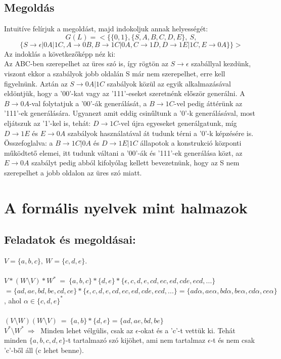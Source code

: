 \documentclass[12pt]{article}
\begin{document}
\subsection{Megoldás}
Intuitíve felírjuk a megoldást, majd indokoljuk annak helyességét:
$$ G(L)=<\{ \{ 0,1 \}, \{ S,A,B,C,D,E \}, \ S, $$ $$ \{ S \rightarrow \epsilon|0A|1C, A \rightarrow 
0B, B \rightarrow 1C|0A, C \rightarrow 1D, D \rightarrow 1E|1C, E \rightarrow 0A \}\}> $$
Az indoklás a következőképp néz ki: \\ Az ABC-ben szerepelhet az üres szó is, 
így rögtön az $S \rightarrow \epsilon$ szabállyal kezdünk, viszont ekkor a szabályok jobb oldalán S már nem
szerepelhet, erre kell figyelnünk. Aztán az $ S \rightarrow 0A|1C$ szabályok közül az egyik alkalmazásával
eldöntjük, hogy a '00'-kat vagy az '111'-eseket szeretnénk először generálni. A $B \rightarrow 0A$-val folytatjuk a
'00'-ák generálását, a $B \rightarrow 1C$-vel pedig áttérünk az '111'-ek generálására. Ugyanezt amit eddig 
csinűltunk a '0'-k generálásával, most eljátszuk az '1'-kel is, tehát: $D \rightarrow 1C$-vel újra egyeseket 
generálgatunk, míg $D \rightarrow 1E$ és $E \rightarrow 0A$ szabályok használatával át tudunk térni a '0'-k 
képzésére is. Összefoglalva: a $B \rightarrow 1C|0A$ és $D \rightarrow 1E|1C$ állapotok a konstrukció központi 
működtető elemei, itt tudunk váltani a '00'-ák és '111'-ek generálása közt, az $E \rightarrow 0A$ szabályt 
pedig abból kifolyólag kellett bevezetnünk, hogy az S nem szerepelhet a jobb oldalon az üres szó miatt.

\section{A formális nyelvek mint halmazok}
\subsection{Feladatok és megoldásai: \\}
$ V=\{ a,b,c \}, \ W=\{ c,d,e \} .$ \\\\
$ V*(W \setminus V)*W^* \ =\ \{a,b,c\}*\{d,e\}*\{\epsilon, c, d, e, cd, ec, ed, cde, ecd, ...\} $ \\
$= \{ad, ae, bd, be, cd, ce\}*\{\epsilon, c, d, e, cd, ec, ed, cde, ecd, ...\} = \{ ad\alpha,
ae\alpha, bd\alpha, be\alpha, cd\alpha, ce\alpha \} $, ahol $\alpha \in \{c,d,e \}^{*}$ \\\\
$ (V \setminus W)(W \setminus V) \ =\ \{a,b\}*\{d,e\} = \{ ad, ae, bd, be \} $ \\
$ V^* \setminus W^*\ \Longrightarrow \ $ Minden lehet vélgülis, csak az $\epsilon$-okat
és a 'c'-t vettük ki. Tehát minden $\{ a,b,c,d,e \} $-t tartalmazó szó kijöhet, ami nem tartalmaz
$\epsilon$-t és nem csak 'c'-ből áll (c lehet benne).
\end{document}
